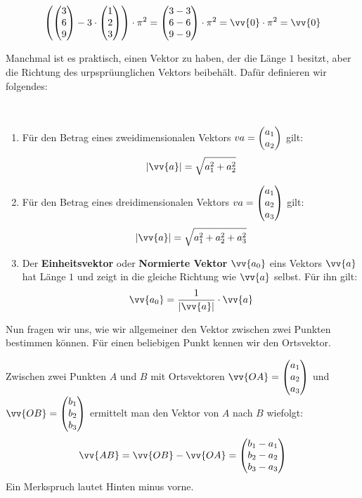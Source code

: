 \documentclass[ngerman, 12pt]{nssheetxea}
\begin{document}
\begin{example} \

\[  \mleft(\colvec[3]{6}{9} - 3 \cdot \colvec[1]{2}{3} \mright)   \cdot \pi^2 =  \colvec[3-3]{6-6}{9-9}  \cdot \pi^2 = \vv{0}\cdot \pi^2 = \vv{0} \]

\end{example}

Manchmal ist es praktisch, einen Vektor zu haben, der die Länge $1$ besitzt, aber die Richtung des urpsprüunglichen Vektors beibehält. Dafür definieren wir folgendes:

\begin{definition} \
\begin{enumerate}
\item Für den Betrag eines zweidimensionalen Vektors $\\v{a}=\colvec{a_1}{a_2}$ gilt:
\[ |\vv{a}| = \sqrt{a_1^2+a_2^2}\]
\item Für den Betrag eines dreidimensionalen Vektors $\\v{a}=\colvec[a_1]{a_2}{a_3}$ gilt:
\[ |\vv{a}| = \sqrt{a_1^2+a_2^2+a_3^2}\]
\item Der \textbf{Einheitsvektor} oder \textbf{Normierte Vektor} $\vv{a_0}$ eins Vektors $\vv{a}$ hat Länge $1$ und zeigt in die gleiche Richtung wie $\vv{a}$ selbst. Für ihn gilt:
\[ \vv{a_0} = \dfrac{1}{|\vv{a}|} \cdot \vv{a}\]
\end{enumerate}
  
\end{definition}
Nun fragen wir uns, wie wir allgemeiner den Vektor zwischen zwei Punkten bestimmen können. Für einen beliebigen Punkt kennen wir den Ortsvektor. 

\begin{theorem}
Zwischen zwei Punkten $A$ und $B$ mit Ortsvektoren $\vv{OA}=\colvec[a_1]{a_2}{a_3}$ und $\vv{OB}=\colvec[b_1]{b_2}{b_3}$ ermittelt man den Vektor von $A$ nach $B$ wiefolgt:
\[ \vv{AB}=\vv{OB} - \vv{OA} = \colvec[b_1-a_1]{b_2-a_2}{b_3-a_3} \]
Ein Merkspruch lautet \glqq Hinten minus vorne.\grqq
\end{theorem}
\end{document}
